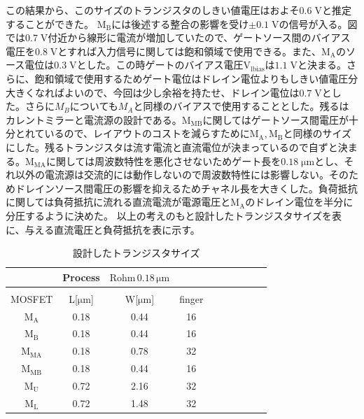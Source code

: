 \documentclass[twocolumn]{jsarticle}
\begin{document}
        この結果から、このサイズのトランジスタのしきい値電圧はおよそ$0.6\;\mathrm{V}$と推定することができた。
        $\mathrm{M_{B}}$には後述する整合の影響を受け$\pm0.1\;\mathrm{V}$の信号が入る。図では$0.7\;\mathrm{V}$付近から線形に電流が増加していたので、ゲートソース間のバイアス電圧を$0.8\;\mathrm{V}$とすれば入力信号に関しては飽和領域で使用できる。また、$\mathrm{M_{A}}$のソース電位は$0.3\;\mathrm{V}$とした。この時ゲートのバイアス電圧$\mathrm{V_{lbias}}$は$1.1\;\mathrm{V}$と決まる。さらに、飽和領域で使用するためゲート電位はドレイン電位よりもしきい値電圧分大きくなればよいので、今回は少し余裕を持たせ、ドレイン電位は$0.7\;\mathrm{V}$とした。さらに$M_{B}$についても$M_{A}$と同様のバイアスで使用することとした。残るはカレントミラーと電流源の設計である。$\mathrm{M_{MB}}$に関してはゲートソース間電圧が十分とれているので、レイアウトのコストを減らすために$\mathrm{M_{A},M_{B}}$と同様のサイズにした。残るトランジスタは流す電流と直流電位が決まっているので自ずと決まる。$\mathrm{M_{MA}}$に関しては周波数特性を悪化させないためゲート長を$0.18\;\mathrm{\mu m}$とし、それ以外の電流源は交流的には動作しないので周波数特性には影響しない。そのためドレインソース間電圧の影響を抑えるためチャネル長を大きくした。負荷抵抗に関しては負荷抵抗に流れる直流電流が電源電圧と$\mathrm{M_{A}}$のドレイン電位を半分に分圧するように決めた。
        \newpage
        以上の考えのもと設計したトランジスタサイズを表に、与える直流電圧と負荷抵抗を表に示す。
        \begin{table}[H]
        \caption{設計したトランジスタサイズ}
        \label{table:size}
        \centering
        \begin{tabular}{cccccccccc}
            \hline
            &Process&$\mathrm{Rohm\,0.18\,\mu m}$&\\
            \hline
            &&&\\
            MOSFET & L[$\mathrm{\mu m}$] & W[$\mathrm{\mu m}$] & finger\\
            \hline \hline
            $\mathrm{M_{A}}$ & 0.18 & 0.44 & 16 \\
            $\mathrm{M_{B}}$ & 0.18 & 0.44 & 16 \\
            $\mathrm{M_{MA}}$& 0.18 & 0.78 & 32 \\
            $\mathrm{M_{MB}}$& 0.18 & 0.44 & 16 \\
            $\mathrm{M_{U}}$ & 0.72 & 2.16 & 32 \\
            $\mathrm{M_{L}}$ & 0.72 & 1.48 & 32 \\            
        \end{tabular}
        \end{table}
\end{document}
